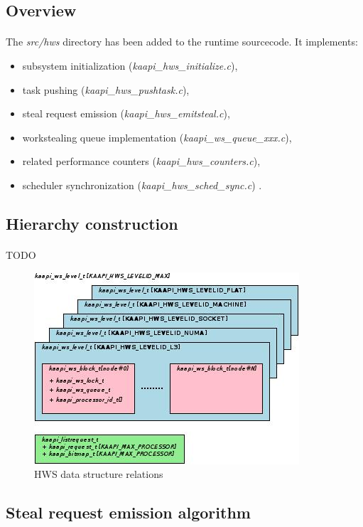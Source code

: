 \documentclass[a4paper, 11pt]{article}
\begin{document}
\subsection{Overview}
\paragraph{}
The \textit{src/hws} directory has been added to the runtime sourcecode. It implements:
\begin{itemize}
\item subsystem initialization (\textit{kaapi\_hws\_initialize.c}),
\item task pushing (\textit{kaapi\_hws\_pushtask.c}),
\item steal request emission (\textit{kaapi\_hws\_emitsteal.c}),
\item workstealing queue implementation (\textit{kaapi\_ws\_queue\_xxx.c}),
\item related performance counters (\textit{kaapi\_hws\_counters.c}),
\item scheduler synchronization (\textit{kaapi\_hws\_sched\_sync.c}) .
\end{itemize}

\subsection{Hierarchy construction}
\paragraph{}
TODO
\begin{figure}[!hb]
\centering
\includegraphics[keepaspectratio=true, scale=0.6]{../dia/impl/main.jpeg}
\caption{HWS data structure relations}
\label{hws_impl}
\end{figure}

\subsection{Steal request emission algorithm}
\end{document}
